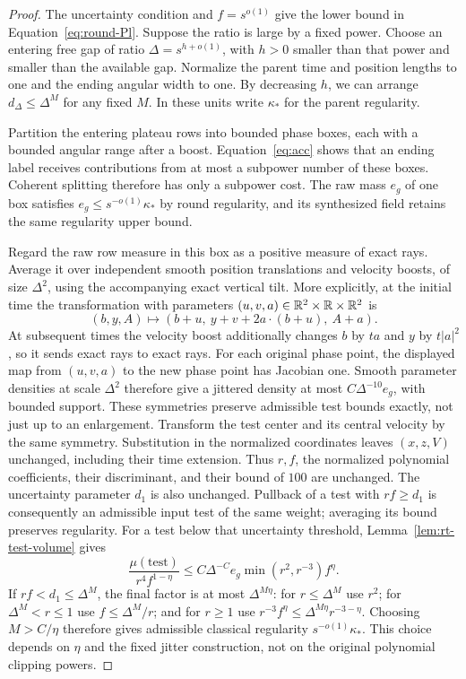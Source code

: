 \begin{proof}
The uncertainty condition and $f=s^{o(1)}$ give the lower bound in
Equation~\eqref{eq:round-Pl}.  Suppose the ratio is large by a fixed
power.  Choose an entering free gap of ratio $\Delta=s^{h+o(1)}$, with
$h>0$ smaller than that power and smaller than the available gap.
Normalize the parent time and position lengths to one and the ending
angular width to one.  By decreasing $h$, we can arrange
$d_\Delta\le\Delta^M$ for any fixed $M$.  In these units write
$\kappa_*$ for the parent regularity.

Partition the entering plateau rows into bounded phase boxes, each with
a bounded angular range after a boost.  Equation~\eqref{eq:acc} shows
that an ending label receives contributions from at most a subpower
number of these boxes.  Coherent splitting therefore has only a
subpower cost.  The raw mass $e_g$ of one box satisfies
$e_g\le s^{-o(1)}\kappa_*$ by round regularity, and its synthesized
field retains the same regularity upper bound.

Regard the raw row measure in this box as a positive measure of exact
rays.  Average it over independent smooth position translations and
velocity boosts, of size $\Delta^2$, using the accompanying exact
vertical tilt.  More explicitly, at the initial time the transformation
with parameters $(u,v,a)\in\mathbb R^2\times\mathbb R\times\mathbb R^2$ is
\[
 (b,y,A)\longmapsto(b+u,\ y+v+2a\cdot(b+u),\ A+a).
\]
At subsequent times the velocity boost additionally changes $b$ by
$ta$ and $y$ by $t|a|^2$, so it sends exact rays to exact rays.
For each original phase point, the displayed map from $(u,v,a)$ to
the new phase point has Jacobian one.  Smooth parameter densities
at scale $\Delta^2$ therefore give a jittered density at most
$C\Delta^{-10}e_g$, with bounded support.
These symmetries preserve admissible test bounds exactly, not just
up to an enlargement.  Transform the test center and its central
velocity by the same symmetry.  Substitution in the normalized
coordinates leaves $(x,z,V)$ unchanged, including their time
extension.  Thus $r,f$, the normalized polynomial coefficients,
their discriminant, and their bound of $100$ are unchanged.
The uncertainty parameter $d_1$ is also unchanged.  Pullback of a
test with $rf\ge d_1$ is consequently an admissible input test
of the same weight; averaging its bound preserves regularity.
For a test below that uncertainty threshold,
Lemma~\ref{lem:rt-test-volume} gives
\[
 \frac{\mu(\text{test})}{r^4f^{1-\eta}}
 \le C\Delta^{-C}e_g\min(r^2,r^{-3})f^\eta.
\]
If $rf<d_1\le\Delta^M$, the final factor is at most
$\Delta^{M\eta}$: for $r\le\Delta^M$ use $r^2$; for
$\Delta^M<r\le1$ use $f\le\Delta^M/r$; and for $r\ge1$ use
$r^{-3}f^\eta\le\Delta^{M\eta}r^{-3-\eta}$.
Choosing $M>C/\eta$ therefore gives admissible classical regularity
$s^{-o(1)}\kappa_*$.  This choice depends on $\eta$ and the fixed
jitter construction, not on the original polynomial clipping powers.


\end{proof}
